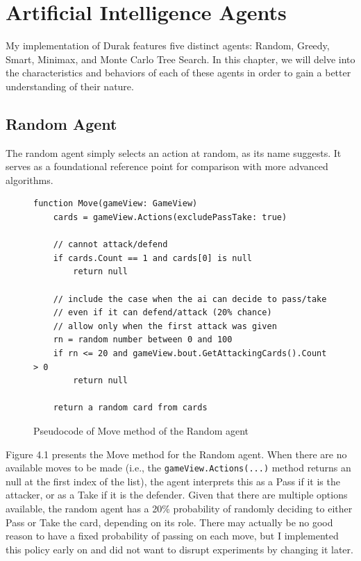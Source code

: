 \chapter{Artificial Intelligence Agents}
\label{AIAgents}

My implementation of Durak features five distinct agents: Random, Greedy, Smart, Minimax, and Monte Carlo Tree Search. In this chapter, we will delve into the characteristics and behaviors of each of these agents in order to gain a better understanding of their nature. 

\section{Random Agent}
The random agent simply selects an action at random, as its name suggests. It serves as a foundational reference point for comparison with more advanced algorithms. 

\begin{figure}[h]
\captionsetup{justification=centering}
\begin{lstlisting}
function Move(gameView: GameView)
    cards = gameView.Actions(excludePassTake: true)

    // cannot attack/defend
    if cards.Count == 1 and cards[0] is null
        return null
    
    // include the case when the ai can decide to pass/take
    // even if it can defend/attack (20% chance)
    // allow only when the first attack was given
    rn = random number between 0 and 100
    if rn <= 20 and gameView.bout.GetAttackingCards().Count > 0
        return null
    
    return a random card from cards
\end{lstlisting}
\caption{Pseudocode of Move method of the Random agent}
\label{fig:randomMove}
\end{figure}

Figure 4.1 presents the Move method for the Random agent. When there are no available moves to be made (i.e., the \texttt{gameView.Actions(...)} method returns an null at the first index of the list), the agent interprets this as a Pass if it is the attacker, or as a Take if it is the defender. Given that there are multiple options available, the random agent has a 20\% probability of randomly deciding to either Pass or Take the card, depending on its role. There may actually be no good reason to have a fixed probability of passing on each move, but I implemented this policy early on and did not want to disrupt experiments by changing it later.



